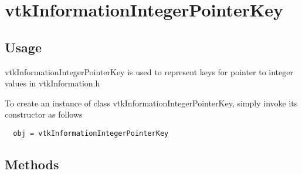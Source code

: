 \section{vtkInformationIntegerPointerKey}

\subsection{Usage}

 vtkInformationIntegerPointerKey is used to represent keys for pointer
 to integer values in vtkInformation.h

To create an instance of class vtkInformationIntegerPointerKey, simply
invoke its constructor as follows
\begin{verbatim}
  obj = vtkInformationIntegerPointerKey
\end{verbatim}
\subsection{Methods}

